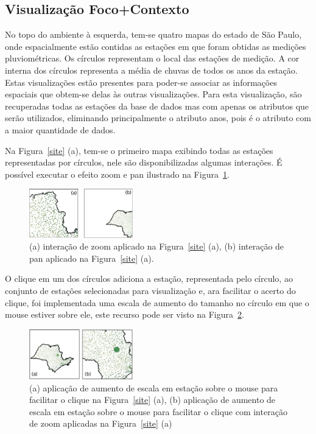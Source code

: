 \documentclass[article,11pt,oneside,a4paper]{abntex2} %
\begin{document}
	\subsection{Visualização Foco+Contexto}
		\hspace{13pt}
	No topo do ambiente à esquerda, tem-se quatro mapas do estado de São Paulo, onde espacialmente estão contidas as estações em que foram obtidas as medições pluviométricas. Os círculos representam o local das estações de medição. A cor interna dos círculos representa a média de chuvas de todos os anos da estação. Estas visualizações estão presentes para poder-se associar as informações espaciais que obtem-se delas às outras visualizações. Para esta visualização, são recuperadas todas as estações da base de dados mas com apenas os atributos que serão utilizados, eliminando principalmente o atributo anos, pois é o atributo com a maior quantidade de dados.
	
	Na Figura~\ref{site} (a), tem-se o primeiro mapa exibindo todas as estações representadas por círculos, nele são disponibilizadas algumas interações. É possível executar o efeito zoom e pan ilustrado na Figura~\ref{mapa_zoom_pan}. 
	
	\begin{figure}[!h]
		\centering
		\includegraphics[width=0.4\textwidth]{figuras/mapa_zoom_pan1}
		\caption{(a) interação de zoom aplicado na Figura~\ref{site} (a), (b) interação de pan aplicado na Figura~\ref{site} (a).}
		\label{mapa_zoom_pan}
	\end{figure}
	
	O clique em um dos círculos adiciona a estação, representada pelo círculo, ao conjunto de estações selecionadas para visualização e, ara facilitar o acerto do clique, foi implementada uma escala de aumento do tamanho no círculo em que o mouse estiver sobre ele, este recurso pode ser visto na Figura~\ref{mapa_click}.
	
	\begin{figure}[!htb]
		\centering
		\includegraphics[width=0.4\textwidth]{figuras/mapa_click1}
		\caption{(a) aplicação de aumento de escala em estação sobre o mouse para facilitar o clique na Figura~\ref{site} (a), (b) aplicação de aumento de escala em estação sobre o mouse para facilitar o clique com interação de zoom aplicadas na Figura~\ref{site} (a)}
		\label{mapa_click}
	\end{figure}
	
\end{document}

